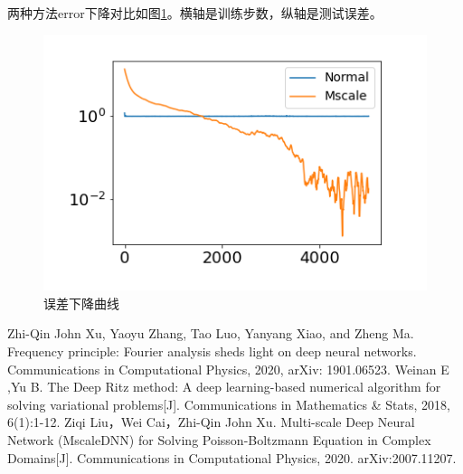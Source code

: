 \documentclass[12pt,a4paper]{article}
\begin{document}
两种方法error下降对比如图\ref{error}。横轴是训练步数，纵轴是测试误差。
\begin{figure}[h]
\centering
\includegraphics[width=0.3\linewidth]{error}
\caption{误差下降曲线}
\label{error}
\end{figure}

\begin{thebibliography}{99}  
 Zhi-Qin John Xu, Yaoyu Zhang, Tao Luo, Yanyang Xiao, and Zheng Ma. Frequency principle: Fourier analysis sheds light on deep neural networks. Communications in
Computational Physics, 2020, arXiv: 1901.06523.  
 Weinan E ,Yu B. The Deep Ritz method: A deep learning-based numerical algorithm for solving variational problems[J]. Communications in Mathematics \& Stats, 2018, 6(1):1-12.
Ziqi Liu，Wei Cai，Zhi-Qin John Xu. Multi-scale Deep Neural Network (MscaleDNN) for Solving Poisson-Boltzmann Equation in Complex Domains[J]. Communications in
Computational Physics, 2020. arXiv:2007.11207.
\end{thebibliography}
\end{document}
